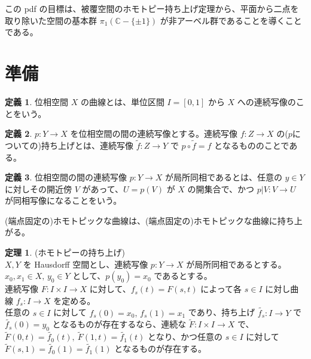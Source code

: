 \documentclass{jsarticle}
\theoremstyle{definition}
\newtheorem*{definition*}{定義}
\newtheorem{theorem}{定理}
\begin{document}
    この pdf の目標は、被覆空間のホモトピー持ち上げ定理から、平面から二点を取り除いた空間の基本群 $\pi_1(\mathbb{C} - \{\pm1\})$ が非アーベル群であることを導くことである。
    
    \section*{準備}
    \begin{definition*}
        位相空間  $X$ の曲線とは、単位区間 $I = [0,1]$ から $X$ への連続写像のことをいう。
    \end{definition*}
    
    \begin{definition*}
        $p : Y \rightarrow X$ を位相空間の間の連続写像とする。連続写像 $f : Z \rightarrow X$ の($p$についての)持ち上げとは、連続写像 $\widetilde{f} : Z \rightarrow Y$ で $p\circ\widetilde{f} = f$ となるもののことである。
    \end{definition*}
    
    \begin{definition*}
        位相空間の間の連続写像 $p : Y \rightarrow X$ が局所同相であるとは、任意の $y \in Y$ に対しその開近傍 $V$ があって、$U = p(V)$ が $X$ の開集合で、かつ $p|V : V \rightarrow U$ が同相写像になることをいう。
    \end{definition*}
    
    \vspace{2.0ex}
    (端点固定の)ホモトピックな曲線は、(端点固定の)ホモトピックな曲線に持ち上がる。
    \begin{theorem} (ホモトピーの持ち上げ) \ \\
        $X, Y$ を Hausdorff 空間とし、連続写像 $p : Y \rightarrow X$ が局所同相であるとする。\\
        $x_0, x_1 \in X, \, y_0 \in Y$ として、$p(y_0) = x_0$ であるとする。\\
        連続写像 $F : I \times I \rightarrow X$ に対して、$f_s(t) = F(s, t)$ によって各 $s \in I$ に対し曲線 $f_s : I \rightarrow X$ を定める。\\
        任意の $s \in I$ に対して $f_s(0) = x_0, \, f_s(1) = x_1$ であり、持ち上げ $\widetilde{f_s} : I \rightarrow Y$ で $\widetilde{f_s}(0) = y_0$ となるものが存在するなら、連続な $\widetilde{F} : I \times I \rightarrow X$ で、$\widetilde{F}(0, t) = \widetilde{f_0}(t), \ \widetilde{F}(1, t) = \widetilde{f_1}(t)$ となり、かつ任意の $s \in I$ に対して $\widetilde{F}(s, 1) = \widetilde{f_0}(1) = \widetilde{f_1}(1)$ となるものが存在する。
    \end{theorem}
    
\end{document}
